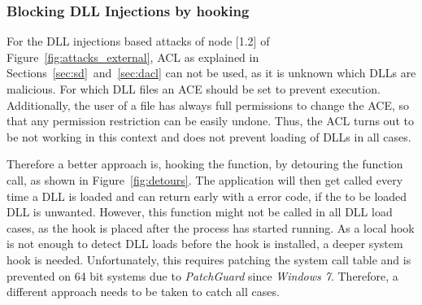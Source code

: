 \subsubsection{Blocking DLL Injections by hooking }
For the \gls{DLL} injections based attacks of node [1.2] of Figure~\ref{fig:attacks_external}, \gls{ACL} as explained in Sections~\ref{sec:sd}~and~\ref{sec:dacl} can not be used, as it is unknown which \glspl{DLL} are malicious. For which \gls{DLL} files an \gls{ACE} should be set to prevent execution. Additionally, the user of a file has always full permissions to change the \gls{ACE}, so that any permission restriction can be easily undone. Thus, the \gls{ACL} turns out to be not working in this context and does not prevent loading of \glspl{DLL} in all cases. 

Therefore a better approach is, hooking the  function, by detouring the function call, as shown in Figure~\ref{fig:detours}. The application will then get called every time a \gls{DLL} is loaded and can return early with a  error code, if the to be loaded \gls{DLL} is unwanted. However, this function might not be called in all \gls{DLL} load cases, as the hook is placed after the process has started running. As a local hook is not enough to detect \gls{DLL} loads before the hook is installed, a deeper system hook is needed. Unfortunately, this requires patching the system call table and is prevented on 64 bit systems due to \emph{PatchGuard} since \emph{Windows 7}. Therefore, a different approach needs to be taken to catch all cases.